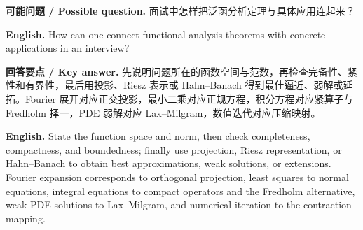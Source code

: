 \documentclass[UTF8,11pt,a4paper]{ctexart}
\newcommand{\EN}[1]{\par\noindent \textbf{English.} #1\par}
\newcommand{\ASK}[4]{\par\noindent \textbf{可能问题 / Possible question.} #1\par\EN{#2}\noindent \textbf{回答要点 / Key answer.} #3\par\EN{#4}\smallskip}
\begin{document}
\ASK{面试中怎样把泛函分析定理与具体应用连起来？}{How can one connect functional-analysis theorems with concrete applications in an interview?}{先说明问题所在的函数空间与范数，再检查完备性、紧性和有界性，最后用投影、Riesz 表示或 Hahn--Banach 得到最佳逼近、弱解或延拓。Fourier 展开对应正交投影，最小二乘对应正规方程，积分方程对应紧算子与 Fredholm 择一，PDE 弱解对应 Lax--Milgram，数值迭代对应压缩映射。}{State the function space and norm, then check completeness, compactness, and boundedness; finally use projection, Riesz representation, or Hahn--Banach to obtain best approximations, weak solutions, or extensions. Fourier expansion corresponds to orthogonal projection, least squares to normal equations, integral equations to compact operators and the Fredholm alternative, weak PDE solutions to Lax--Milgram, and numerical iteration to the contraction mapping.}

\end{document}

